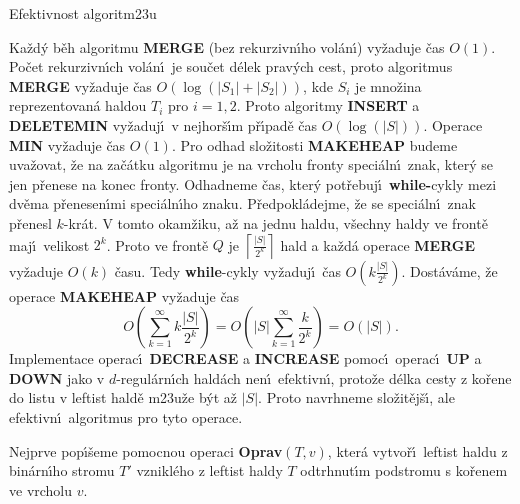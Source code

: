 \subhead
Efektivnost algoritm\accent23u
\endsubhead 
\smallskip

\flushpar Ka\v zd\'y b\v eh algoritmu {\bf MERGE} (bez rekurzivn\'\i ho vol\'an\'\i ) 
vy\v zaduje \v cas $O\left(1\right)$. Po\v cet rekurzivn\'\i ch vol\'an\'\i\ je 
sou\v cet d\'elek prav\'ych cest, proto algoritmus {\bf MERGE} vy\v zaduje 
\v cas $O\left(\log\left(|S_1|+|S_2|\right)\right)$, 
kde $S_i$ je mno\v zina reprezentovan\'a haldou $T_i$ pro $i=1,2$.
Proto algoritmy {\bf INSERT} a {\bf DELETEMIN} vy\v zaduj\'\i\ v 
nejhor\v s\'\i m p\v r\'\i pad\v e \v cas $O\left(\log\left(|S|\right)\right)$. Ope\-race {\bf MIN} vy\v zaduje 
\v cas $O\left(1\right)$. Pro odhad slo\v zitosti {\bf MA\-KEHEAP} budeme 
uva\v zovat, \v ze na za\v c\'atku algoritmu je na vrcholu fronty 
speci\'aln\'\i\ znak, kter\'y se jen p\v renese na konec fronty. 
Odhadneme \v cas, kter\'y pot\v rebuj\'\i\ {\bf while-}cykly mezi dv\v e\-ma 
p\v renesen\'\i mi speci\'aln\'\i ho znaku. P\v redpokl\'adejme, \v ze se 
spe\-ci\'al\-n\'\i\ znak p\v renesl $k$-kr\'at. V tomto okam\v ziku, a\v z na 
jednu haldu, v\v sechny haldy ve front\v e maj\'\i\ velikost $2^k$. 
Proto ve front\v e $Q$ je $\left\lceil\frac {|S|}{2^k}\right\rceil$ hald a ka\v zd\'a operace 
{\bf MERGE} vy\v zadu\-je $O\left(k\right)$ \v casu. Tedy {\bf while}-cykly vy\v zaduj\'\i\ 
\v cas $O\left(k\frac {|S|}{2^k}\right)$. Dost\'a\-v\'a\-me, \v ze ope\-race {\bf MAKEHEAP} vy\v zaduje \v cas 
$$O\left(\sum_{k=1}^{\infty}k\frac {|S|}{2^k}\right)=O\left(|S|\sum_{k=1}^{\infty}\frac 
k{2^k}\right)=O\left(|S|\right).$$
Implementace operac\'\i\ {\bf DECREASE} a {\bf INCREASE} pomoc\'\i\ 
operac\'\i\ {\bf UP} a {\bf DOWN} jako v $d$-regul\'arn\'\i ch hald\'ach nen\'\i\ 
efektivn\'\i , proto\v ze d\'elka cesty z ko\v rene do listu v leftist 
hald\v e m\accent23u\v ze b\'yt a\v z $|S|$. Proto navrhneme 
slo\v zit\v ej\v s\'\i , ale efektivn\'\i\ algoritmus pro tyto operace.
\medskip

\flushpar Nejprve pop\'\i\v seme pomocnou operaci {\bf Oprav$\left(T,v
\right)$}, 
kter\'a vy\-tvo\-\v r\'\i\ lef\-tist haldu z bin\'arn\'\i ho stromu $
T'$ vznikl\'eho z 
leftist haldy $T$ odtrhnut\'\i m podstromu s ko\v renem ve vrcholu $
v$.
\bigskip


